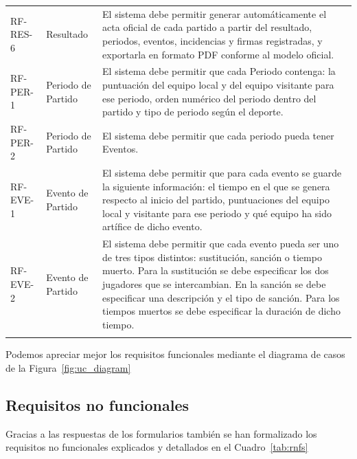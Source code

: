 {\begin{xltabular}{\textwidth}{>{\RaggedRight}p{1.7cm} p{1.8cm} >{\RaggedRight\arraybackslash}X}
        RF-RES-6 & Resultado & El sistema debe permitir generar automáticamente el acta oficial de cada partido a partir del resultado, periodos, eventos, incidencias y firmas registradas, y exportarla en formato PDF conforme al modelo oficial. \\ \lightrule
        RF-PER-1 & Periodo de Partido & El sistema debe permitir que cada Periodo contenga: la puntuación del equipo local y del equipo visitante para ese periodo, orden numérico del periodo dentro del partido y tipo de periodo según el deporte. \\ \lightrule
        RF-PER-2 & Periodo de Partido & El sistema debe permitir que cada periodo pueda tener Eventos. \\ \lightrule
        RF-EVE-1 & Evento de Partido & El sistema debe permitir que para cada evento se guarde la siguiente información: el tiempo en el que se genera respecto al inicio del partido, puntuaciones del equipo local y visitante para ese periodo y qué equipo ha sido artífice de dicho evento. \\ \lightrule
        RF-EVE-2 & Evento de Partido & El sistema debe permitir que cada evento pueda ser uno de tres tipos distintos: sustitución, sanción o tiempo muerto. Para la sustitución se debe especificar los dos jugadores que se intercambian. En la sanción se debe especificar una descripción y el tipo de sanción. Para los tiempos muertos se debe especificar la duración de dicho tiempo. \\ \lightrule
    \end{xltabular}
}

Podemos apreciar mejor los requisitos funcionales mediante el diagrama de casos de la Figura~\ref{fig:uc_diagram}

\subsection{Requisitos no funcionales}

Gracias a las respuestas de los formularios también se han formalizado los requisitos no funcionales explicados y detallados en el Cuadro~\ref{tab:rnfs}

